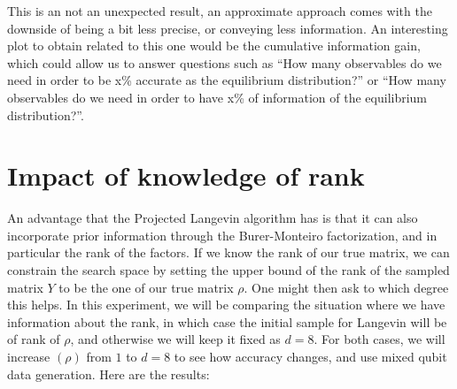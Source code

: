 \documentclass[12pt]{memoir}
\newcommand{\rhorank}[0]{\text{rank}$(\rho) $ }
\begin{document}
This is an not an unexpected result, an approximate approach comes with the downside of being a bit less precise, or conveying less information. An interesting plot to obtain related to this one would be the cumulative information gain, which could allow us to answer questions such as ``How many observables do we need in order to be x\% accurate as the equilibrium distribution?'' or ``How many observables do we need in order to have x\% of information of the equilibrium distribution?''.

\section{Impact of knowledge of rank}\label{section:comp-rank-info}
An advantage that the Projected Langevin algorithm has is that it can also incorporate prior information through the Burer-Monteiro factorization, and in particular the rank of the factors. If we know the rank of our true matrix, we can constrain the search space by setting the upper bound of the rank of the sampled matrix $Y$ to be the one of our true matrix $\rho$. One might then ask to which degree this helps. In this experiment, we will be comparing the situation where we have information about the rank, in which case the initial sample for Langevin will be of rank of $\rho$, and otherwise we will keep it fixed as $d=8$. For both cases, we will increase \rhorank from $1$ to $d=8$ to see how accuracy changes, and use mixed qubit data generation. Here are the results:
\end{document}
